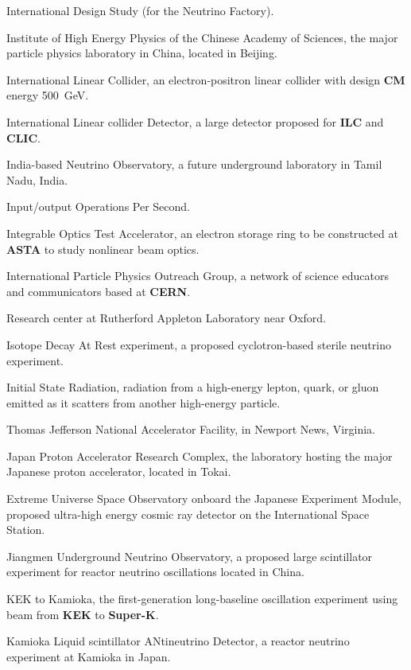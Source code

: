  International Design Study (for the Neutrino Factory).

 Institute of High Energy Physics of the Chinese Academy of
Sciences, the major particle physics laboratory in China, located in Beijing.

 International Linear Collider, an electron-positron linear 
collider with design {\bf CM}  energy 500~GeV.

 International Linear collider Detector, a large detector
proposed for {\bf ILC} and {\bf CLIC}. 

 India-based Neutrino Observatory, a future underground
laboratory in Tamil Nadu, India.

  Input/output Operations Per Second.

  Integrable Optics Test Accelerator, an electron
storage  ring to be constructed at {\bf ASTA} to study nonlinear beam optics.

 International Particle Physics Outreach Group, a
network of science educators and communicators based at {\bf CERN}.

 Research center at Rutherford Appleton Laboratory near Oxford.

 Isotope Decay At Rest experiment, a
proposed cyclotron-based sterile neutrino experiment.

 Initial State Radiation, radiation from a high-energy lepton,
quark, or gluon emitted as it scatters from another high-energy
particle.

  Thomas Jefferson National Accelerator Facility, in
Newport News, Virginia.

 Japan Proton Accelerator Research Complex, the laboratory
hosting the major Japanese proton accelerator, located in Tokai.

  Extreme Universe Space Observatory onboard the Japanese
Experiment Module, proposed ultra-high energy cosmic ray detector on
the International Space Station.


 Jiangmen Underground Neutrino Observatory, a proposed large
scintillator experiment for reactor neutrino oscillations located in China.

 KEK to Kamioka, the first-generation long-baseline
oscillation experiment using beam from {\bf KEK} to {\bf Super-K}.

 Kamioka Liquid scintillator ANtineutrino
Detector, a reactor neutrino experiment at Kamioka in Japan.

